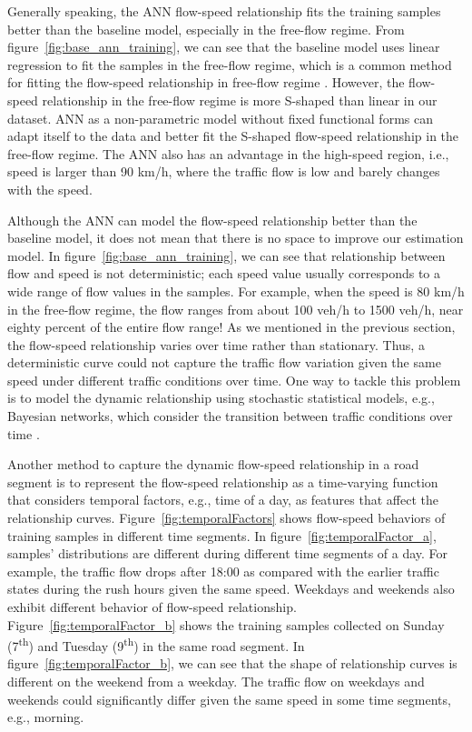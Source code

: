 \documentclass[english]{kththesis}
\begin{document}
Generally speaking, the ANN flow-speed relationship fits the training samples better than the baseline model, especially in the free-flow regime. From figure~\ref{fig:base_ann_training}, we can see that the baseline model uses linear regression to fit the samples in the free-flow regime, which is a common method for fitting the flow-speed relationship in free-flow regime \cite{blandin_individual_speed, nielsen_flow-speed_relations}. However, the flow-speed relationship in the free-flow regime is more S-shaped than linear in our dataset. ANN as a non-parametric model without fixed functional forms can adapt itself to the data and better fit the S-shaped flow-speed relationship in the free-flow regime. The ANN also has an advantage in the high-speed region, i.e., speed is larger than 90 km/h, where the traffic flow is low and barely changes with the speed.


Although the ANN can model the flow-speed relationship better than the baseline model, it does not mean that there is no space to improve our estimation model. In figure~\ref{fig:base_ann_training}, we can see that relationship between flow and speed is not deterministic; each speed value usually corresponds to a wide range of flow values in the samples. For example, when the speed is 80 km/h in the free-flow regime, the flow ranges from about 100 veh/h to 1500 veh/h, near eighty percent of the entire flow range! As we mentioned in the previous section, the flow-speed relationship varies over time rather than stationary. Thus, a deterministic curve could not capture the traffic flow variation given the same speed under different traffic conditions over time. One way to tackle this problem is to model the dynamic relationship using stochastic statistical models, e.g., Bayesian networks, which consider the transition between traffic conditions over time  \cite{neumann_bayesian}.

Another method to capture the dynamic flow-speed relationship in a road segment is to represent the flow-speed relationship as a time-varying function that considers temporal factors, e.g., time of a day, as features that affect the relationship curves. Figure~\ref{fig:temporalFactors} shows flow-speed behaviors of training samples in different time segments. In figure~\ref{fig:temporalFactor_a}, samples' distributions are different during different time segments of a day. For example, the traffic flow drops after 18:00 as compared with the earlier traffic states during the rush hours given the same speed. Weekdays and weekends also exhibit different behavior of flow-speed relationship. Figure~\ref{fig:temporalFactor_b} shows the training samples collected on Sunday (7\textsuperscript{th}) and Tuesday (9\textsuperscript{th}) in the same road segment. In figure~\ref{fig:temporalFactor_b}, we can see that the shape of relationship curves is different on the weekend from a weekday. The traffic flow on weekdays and weekends could significantly differ given the same speed in some time segments, e.g., morning.
\end{document}
